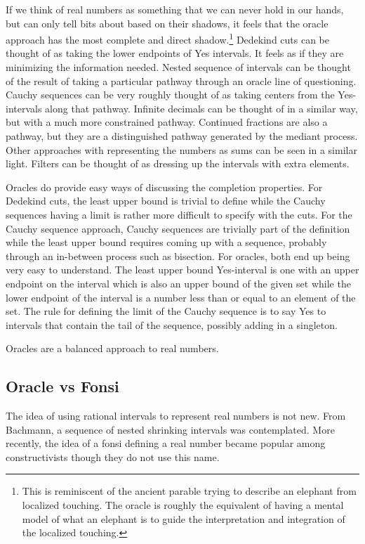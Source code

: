 \documentclass[12pt]{article}
\begin{document}
If we think of real numbers as something that we can never hold in our hands, but can only tell bits about based on their shadows, it feels that the oracle approach has the most complete and direct shadow.\footnote{This is reminiscent of the ancient parable trying to describe an elephant from localized touching. The oracle is roughly the equivalent of having a mental model of what an elephant is to guide the interpretation and integration of the localized touching.} Dedekind cuts can be thought of as taking the lower endpoints of Yes intervals. It feels as if they are minimizing the information needed.  Nested sequence of intervals can be thought of the result of taking a particular pathway through an oracle line of questioning. Cauchy sequences can be very roughly thought of as taking centers from the Yes-intervals along that pathway. Infinite decimals can be thought of in a similar way, but with a much more constrained pathway. Continued fractions are also a pathway, but they are a distinguished pathway generated by the mediant process. Other approaches with representing the numbers as sums can be seen in a  similar light. Filters can be thought of as dressing up the intervals with extra elements.

Oracles do provide easy ways of discussing the completion properties. For Dedekind cuts, the least upper bound is trivial to define while the Cauchy sequences having a limit is rather more difficult to specify with the cuts. For the Cauchy sequence approach, Cauchy sequences are trivially part of the definition while the least upper bound requires coming up with a sequence, probably through an in-between process such as bisection. For oracles, both end up being very easy to understand. The least upper bound Yes-interval is one with an upper endpoint on the interval which is also an upper bound of the given set while the lower endpoint of the interval is a number less than or equal to an element of the set. The rule for defining the limit of the Cauchy sequence is to say Yes to intervals that contain the tail of the sequence, possibly adding in a singleton.  

Oracles are a balanced approach to real numbers. 

\subsection{Oracle vs Fonsi}

The idea of using rational intervals to represent real numbers is not new. From Bachmann, a sequence of nested shrinking intervals was contemplated. More recently, the idea of a fonsi defining a real number became popular among constructivists though they do not use this name.
\end{document}
